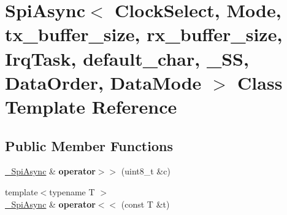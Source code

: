 \hypertarget{classSpiAsync}{}\section{Spi\+Async$<$ Clock\+Select, Mode, tx\+\_\+buffer\+\_\+size, rx\+\_\+buffer\+\_\+size, Irq\+Task, default\+\_\+char, \+\_\+\+SS, Data\+Order, Data\+Mode $>$ Class Template Reference}
\label{classSpiAsync}
\subsection*{Public Member Functions}
\begin{DoxyCompactItemize}
\item 
\hypertarget{classSpiAsync_a9a44b080f0db081901bb96f1c2b12eec}{}\label{classSpiAsync_a9a44b080f0db081901bb96f1c2b12eec} 
\hyperlink{classSpiAsync}{\+\_\+\+Spi\+Async} \& {\bfseries operator$>$$>$} (uint8\+\_\+t \&c)
\item 
\hypertarget{classSpiAsync_ac3736126fbedcccdbe524a565056d15b}{}\label{classSpiAsync_ac3736126fbedcccdbe524a565056d15b} 
{\footnotesize template$<$typename T $>$ }\\\hyperlink{classSpiAsync}{\+\_\+\+Spi\+Async} \& {\bfseries operator$<$$<$} (const T \&t)
\end{DoxyCompactItemize}
